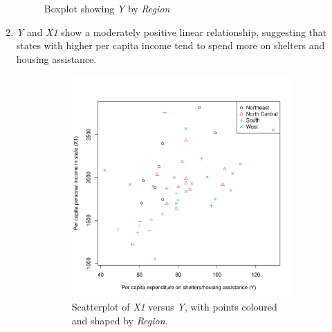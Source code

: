 \documentclass[12pt,letterpaper]{article}
\begin{document}
\begin{enumerate}
\begin{figure}[h]
			\caption{Boxplot showing \emph{Y} by \emph{Region}}
		\end{figure}
		 
	\newpage
	\item \emph{Y} and \emph{X1} show a moderately positive linear relationship, suggesting that states with higher per capita income tend to spend more on shelters and housing assistance.\\
		\begin{figure}[h]
			\centering
			\begin{subfigure}{0.48\textwidth}
				\centering
				\includegraphics[width=\linewidth]{scatter_plot_2_3b.pdf}
				\caption{Scatterplot of \emph{X1} versus \emph{Y}, with points coloured and shaped by \emph{Region}.}
			\end{subfigure}
			\hfill
			\begin{subfigure}{0.48\textwidth}
				\centering

\end{subfigure}
\end{figure}
\end{enumerate}
\end{document}

